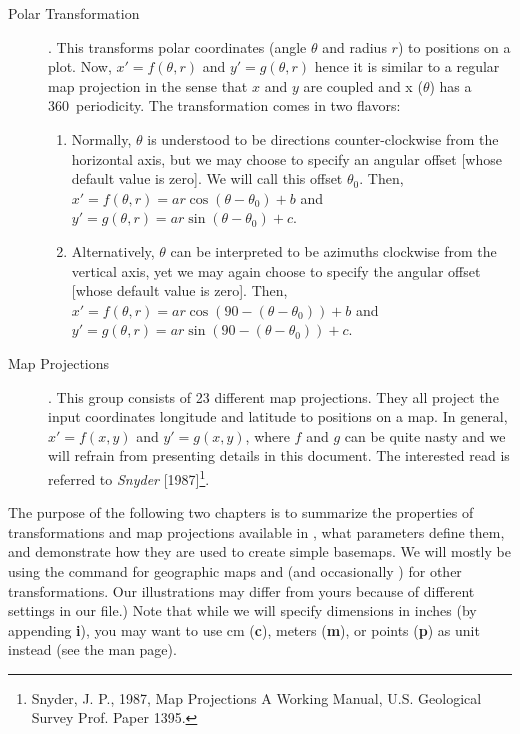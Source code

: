 \begin{description}
\item [Polar Transformation]. This transforms polar coordinates (angle $\theta$ and radius $r$)
to positions on a plot.  Now, $x' = f(\theta,r)$ and $y' = g(\theta,r)$ hence it is similar
to a regular map projection in the sense that $x$ and $y$ are coupled and x ($\theta$) has a 360\DS\ periodicity.
The transformation comes in two flavors:

\begin{enumerate}
\item Normally, $\theta$ is understood to be directions counter-clockwise from the horizontal axis, but we may choose
to specify an angular offset [whose default value is zero].  We will call this offset $\theta_0$.
Then, $x' = f(\theta, r) = ar \cos (\theta-\theta_0) + b$ and $y' = g(\theta, r) = ar \sin (\theta-\theta_0) + c$.
\item Alternatively, $\theta$ can be interpreted to be azimuths clockwise from the vertical axis, yet we may again
choose to specify the angular offset [whose default value is zero].
Then, $x' = f(\theta, r) = ar \cos (90 - (\theta-\theta_0)) + b$ and $y' = g(\theta, r) = ar \sin (90 - (\theta-\theta_0)) + c$.
\end{enumerate}

\item [Map Projections].  This group consists of 23 different map projections.  They all project the input coordinates
longitude and latitude to positions on a map.  In general, $x' = f(x,y)$ and $y' = g(x,y)$, where $f$ and $g$ can be
quite nasty and we will refrain from presenting details in this document.  The interested read is referred to
{\it Snyder} [1987]\footnote{Snyder, J. P., 1987, Map Projections \- A Working Manual, U.S. Geological Survey Prof. Paper 1395.}.
\end{description}

The purpose of the following two chapters is to summarize the properties
of transformations and map projections available in \GMT, what parameters define
them, and demonstrate how they are used to create simple
basemaps.  We will mostly be using the 
command for geographic maps and  (and occasionally ) for other transformations.
Our illustrations may differ from yours because of different settings in our
 file.)  Note that while we will
specify dimensions in inches (by appending {\bf i}), you may
want to use cm ({\bf c}), meters ({\bf m}), or points ({\bf p})
as unit instead (see the  man page). 
